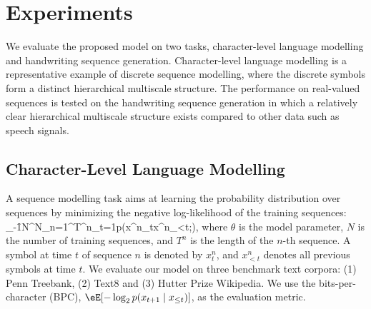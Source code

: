 \section{Experiments}
\label{sec:experiments}
We evaluate the proposed model on two tasks, character-level language modelling and handwriting sequence generation. Character-level language modelling is a representative example of discrete sequence modelling, where the discrete symbols form a distinct hierarchical multiscale structure. The performance on real-valued sequences is tested on the handwriting sequence generation in which a relatively clear hierarchical multiscale structure exists compared to other data such as speech signals. 

\subsection{Character-Level Language Modelling} A sequence modelling task aims at learning the probability distribution over sequences by minimizing the negative log-likelihood of the training sequences:
\bea
	\label{eq:sequence_task}
	\min_{\theta}-\f{1}{N}\sum^{N}_{n=1}\sum^{T^n}_{t=1}\log p\left(x^n_t\mid x^n_{<t};\theta\right),
\eea
where $\theta$ is the model parameter, $N$ is the number of training sequences, and $T^n$ is the length of the $n$-th sequence. A symbol at time $t$ of sequence $n$ is denoted by $x_t^n$, and $x^n_{<t}$ denotes all previous symbols at time $t$. We evaluate our model on three benchmark text corpora: (1) Penn Treebank, (2) Text8 and (3) Hutter Prize Wikipedia. We use the bits-per-character (BPC), $\eE[-\log_2 p(x_{t+1} \mid x_{\leq t})]$, as the evaluation metric.


